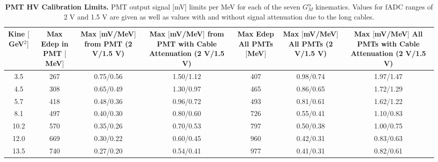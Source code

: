 \documentclass[10pt]{article}
\begin{document}
	\begin{table}[h]
	\centering
	\begin{tabular}{|c|cccccc|}
	\hline
	\makecell{Kine\\$[$GeV$^2]$} & \makecell{Max Edep\\in PMT\\$[$MeV$]$} & \makecell{Max $[$mV/MeV$]$\\from PMT\\(2 V/1.5 V)} & \makecell{Max $[$mV/MeV$]$\\from PMT\\with Cable\\Attenuation\\(2 V/1.5 V)} & \makecell{Max Edep\\All PMTs\\$[$MeV$]$} & \makecell{Max $[$mV/MeV$]$\\All PMTs\\(2 V/1.5 V)} & \makecell{Max $[$mV/MeV$]$\\All PMTs\\with Cable\\Attenuation\\(2 V/1.5 V)}\\
	\hline
	3.5 & 267 & 0.75/0.56 & 1.50/1.12 & 407 & 0.98/0.74 & 1.97/1.47\\
    4.5 & 308 & 0.65/0.49 & 1.30/0.97 & 465 & 0.86/0.65 & 1.72/1.29 \\
    5.7 & 418 & 0.48/0.36 & 0.96/0.72 & 493 & 0.81/0.61 & 1.62/1.22 \\
    8.1 & 497 & 0.40/0.30 & 0.80/0.60 & 726 & 0.55/0.41 & 1.10/0.83 \\
    10.2 & 570 & 0.35/0.26 & 0.70/0.53 & 797 & 0.50/0.38 & 1.00/0.75\\
    12.0 & 669 & 0.30/0.22 & 0.60/0.45 & 960 & 0.42/0.31 & 0.83/0.63\\
    13.5 & 740 & 0.27/0.20 & 0.54/0.41 & 977 & 0.41/0.31 & 0.82/0.61\\
	\hline
	\end{tabular}
	\caption{{\bf{PMT HV Calibration Limits.}} PMT output signal [mV] limits per MeV for each of the seven $G_M^n$ kinematics. Values for fADC ranges of 2 V and 1.5 V are given as well as values with and without signal attenuation due to the long cables.} %
	\label{tab:max_outputs}
	\end{table}
	
	
\end{document}
